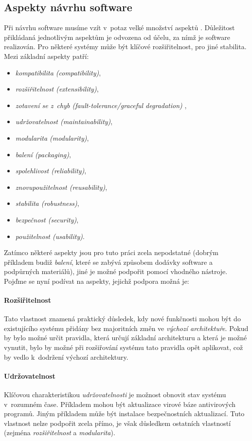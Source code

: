 \subsection{Aspekty návrhu software}
\label{analysis-sw_design_aspects}
Při návrhu software musíme vzít v~potaz velké množství aspektů \cite{wiki:software_design}. Důležitost přikládaná jednotlivým aspektům je odvozena od účelu, za nímž je software realizován. Pro některé systémy může být klíčové rozšiřitelnost, pro jiné stabilita. Mezi základní aspekty patří:

\begin{itemize}
\item \emph{kompatibilita (compatibility)},
\item \emph{rozšiřitelnost (extensibility)},
\item \emph{zotavení se z~chyb (fault-tolerance/graceful degradation)} \cite{wiki:fault-tolerance},
\item \emph{udržovatelnost (maintainability)},
\item \emph{modularita (modularity)},
\item \emph{balení (packaging)},
\item \emph{spolehlivost (reliability)},
\item \emph{znovupoužitelnost (reusability)},
\item \emph{stabilita (robustness)},
\item \emph{bezpečnost (security)},
\item \emph{použitelnost (usability)}.
\end{itemize}

Zatímco některé aspekty jsou pro tuto práci zcela nepodstatné (dobrým příkladem budiž \emph{balení}, které se zabývá způsobem dodávky software a podpůrných materiálů), jiné je možné podpořit pomocí vhodného nástroje. Pojďme se nyní podívat na aspekty, jejichž podpora možná je:

\paragraph{Rozšiřitelnost} Tato vlastnost znamená praktický důsledek, kdy nové funkčnosti mohou být do existujícího systému přidány bez majoritních změn ve \emph{výchozí architektuře}. Pokud by bylo možné určit pravidla, která určují základní architekturu a která je možné vynutit, bylo by možné při rozšiřování systému tato pravidla opět aplikovat, což by vedlo k~dodržení výchozí architektury.

\paragraph{Udržovatelnost} Klíčovou charakteristikou \emph{udržovatelnosti} je možnost obnovit stav systému v~rozumném čase. Příkladem mohou být aktualizace virové báze antivirových programů. Jiným příkladem může být instalace bezpečnostních aktualizací. Tuto vlastnost nelze podpořit zcela přímo, je však důsledkem ostatních vlastností (zejména \emph{rozšiřitelnost} a \emph{modularita}).

